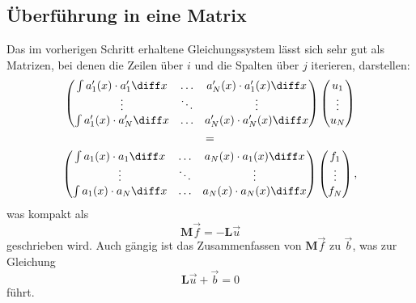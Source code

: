 \subsection{Überführung in eine Matrix\label{fem:1d:final_eq}}
Das im vorherigen Schritt erhaltene Gleichungssystem lässt sich sehr gut als Matrizen, bei denen die Zeilen über $i$ und die Spalten über $j$ iterieren, darstellen:
\begin{multline}
    \left(
        \begin{matrix}
            \int a'_1(x) \cdot a'_1 \diff x & \hdots & a'_N(x) \cdot a'_1(x) \diff x \\
            \vdots                          & \ddots & \vdots                        \\
            \int a'_1(x) \cdot a'_N \diff x & \hdots & a'_N(x) \cdot a'_N(x) \diff x \\
        \end{matrix}
    \right)
    \left(
        \begin{matrix}
            u_1 \\
            \vdots \\
            u_N
        \end{matrix}
    \right) \\
    = \\
    \left(
        \begin{matrix}
            \int a_1(x) \cdot a_1 \diff x & \hdots & a_N(x) \cdot a_1(x) \diff x \\
            \vdots                        & \ddots & \vdots                      \\
            \int a_1(x) \cdot a_N \diff x & \hdots & a_N(x) \cdot a_N(x) \diff x \\
        \end{matrix}
    \right)
    \left(
        \begin{matrix}
            f_1 \\
            \vdots \\
            f_N
        \end{matrix}
    \right),
\end{multline}
was kompakt als
\begin{equation}
    \mathbf{M}\vec{f} = -\mathbf{L}\vec{u}
\end{equation}
geschrieben wird.
Auch gängig ist das Zusammenfassen von $\mathbf{M}\vec{f}$ zu $\vec{b}$, was zur Gleichung
\begin{equation}
    \mathbf{L}\vec{u} + \vec{b} = 0
\end{equation}
führt.

